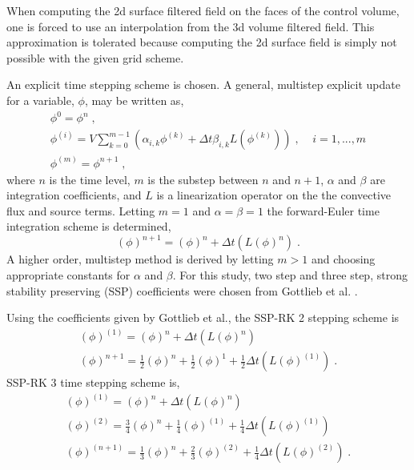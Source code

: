 When computing the 2d surface filtered field on the faces of the control volume, one is forced to use an interpolation from the 3d volume filtered field.  This approximation is tolerated because computing the 2d surface field is simply not possible with the given grid scheme. %

An explicit time stepping scheme is chosen.  A general, multistep explicit update for a variable, $\phi$, may be written as, 
%
\begin{eqnarray}\label{eqn:forward_euler}
\phi^0 = \phi^n \; , \nonumber \\
  \phi^{(i)} = V \sum_{k=0}^{m-1}
\left( \alpha_{i,k}  \phi^{(k)} +
\Delta t \beta_{i,k} L( \phi^{(k)}) \right) \; , \; \; \; \; i = 1, ..., m \\
\phi^{(m)} = \phi^{n+1} \; , \nonumber
\end{eqnarray}
%
where $n$ is the time level, $m$ is the substep between $n$ and $n+1$, $\alpha$ and $\beta$ are integration coefficients, and $L$ is a linearization operator on the the convective flux and source terms.
%
Letting $m=1$ and $\alpha = \beta = 1$ the forward-Euler time
integration scheme is determined,
\begin{equation}\label{eqn:forward_euler}
\left(  \phi \right)^{n+1} = \left(
\phi \right)^{n} + \Delta t (L( \phi)^n) \; .
\end{equation}
A higher order, multistep method is derived by letting $m > 1$ and
choosing appropriate constants for $\alpha$ and $\beta$. For this
study, two step and three step, strong stability preserving (SSP)
coefficients were chosen from Gottlieb et al.
\cite{Gottlieb75}.

Using the coefficients given by Gottlieb et al., the SSP-RK 2 stepping scheme is
\begin{eqnarray}\label{eqn:rk_second_order}
( \phi)^{(1)} = ( \phi)^{n} + \Delta
t (L(\phi)^n) \\ \nonumber
( \phi)^{n+1} = \frac{1}{2}(
\phi)^{n} + \frac{1}{2}( \phi)^{1} +
\frac{1}{2}\Delta t (L( \phi)^{(1)}) \;.
\end{eqnarray}
SSP-RK 3 time stepping scheme is,
\begin{eqnarray}\label{eqn:rk_second_order}
(\phi)^{(1)} = (\phi)^{n} + \Delta t (L(\phi)^n) \\ \nonumber
(\phi)^{(2)} = \frac{3}{4}(\phi)^{n} + \frac{1}{4}( \phi)^{(1)} +
\frac{1}{4}\Delta t (L( \phi)^{(1)}) \\ \nonumber ( \phi)^{(n+1)} =
\frac{1}{3}(\phi)^{n} + \frac{2}{3}(
\phi)^{(2)} + \frac{1}{4}\Delta t (L(
\phi)^{(2)}) \; .
\end{eqnarray}

